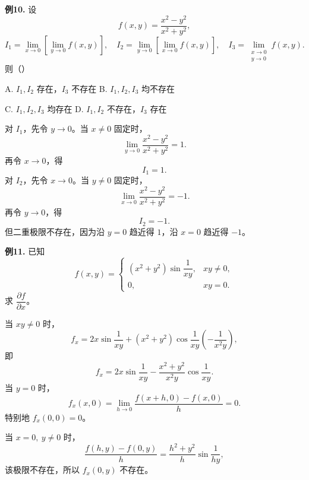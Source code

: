 \begin{problemblock}
\textbf{例10.} 设
\[
f(x,y)=\frac{x^2-y^2}{x^2+y^2},
\]
\[
I_1=\lim_{x\to0}\left[\lim_{y\to0}f(x,y)\right],\quad
I_2=\lim_{y\to0}\left[\lim_{x\to0}f(x,y)\right],\quad
I_3=\lim_{\substack{x\to0\\y\to0}}f(x,y).
\]
则（\quad）

A. \(I_1,I_2\) 存在，\(I_3\) 不存在
\quad
B. \(I_1,I_2,I_3\) 均不存在

C. \(I_1,I_2,I_3\) 均存在
\quad
D. \(I_1,I_2\) 不存在，\(I_3\) 存在
\end{problemblock}
\begin{solutionblock}
对 \(I_1\)，先令 \(y\to0\)。当 \(x\ne0\) 固定时，
\[
\lim_{y\to0}\frac{x^2-y^2}{x^2+y^2}=1.
\]
再令 \(x\to0\)，得
\[
I_1=1.
\]
对 \(I_2\)，先令 \(x\to0\)。当 \(y\ne0\) 固定时，
\[
\lim_{x\to0}\frac{x^2-y^2}{x^2+y^2}=-1.
\]
再令 \(y\to0\)，得
\[
I_2=-1.
\]
但二重极限不存在，因为沿 \(y=0\) 趋近得 \(1\)，沿 \(x=0\) 趋近得 \(-1\)。
\end{solutionblock}

\begin{problemblock}
\textbf{例11.} 已知
\[
f(x,y)=
\begin{cases}
(x^2+y^2)\sin\dfrac1{xy},&xy\ne0,\\
0,&xy=0.
\end{cases}
\]
求 \(\dfrac{\partial f}{\partial x}\)。
\end{problemblock}
\begin{solutionblock}
当 \(xy\ne0\) 时，
\[
f_x
=2x\sin\frac1{xy}
+(x^2+y^2)\cos\frac1{xy}\left(-\frac1{x^2y}\right),
\]
即
\[
f_x=2x\sin\frac1{xy}
-\frac{x^2+y^2}{x^2y}\cos\frac1{xy}.
\]
当 \(y=0\) 时，
\[
f_x(x,0)=\lim_{h\to0}\frac{f(x+h,0)-f(x,0)}h=0.
\]
特别地 \(f_x(0,0)=0\)。

当 \(x=0,\ y\ne0\) 时，
\[
\frac{f(h,y)-f(0,y)}h
=\frac{h^2+y^2}{h}\sin\frac1{hy},
\]
该极限不存在，所以 \(f_x(0,y)\) 不存在。
\answer{\[
f_x(x,y)=
\begin{cases}
2x\sin\dfrac1{xy}
-\dfrac{x^2+y^2}{x^2y}\cos\dfrac1{xy},&xy\ne0,\\
0,&y=0,\\
\text{不存在},&x=0,\ y\ne0.
\end{cases}
\]}
\end{solutionblock}

